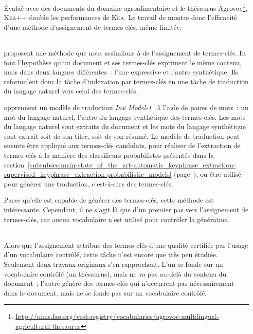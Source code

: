     Évalué avec des documents du domaine agroalimentaire et le thésaurus
    Agrovoc\footnote{\url{http://aims.fao.org/vest-registry/vocabularies/agrovoc-multilingual-agricultural-thesaurus}},
    \textsc{Kea}++ double les performances de \textsc{Kea}. Le travail de
     montre donc l'efficacité d'une méthode
    d'assignement de termes-clés, même limitée.

    ~\\ proposent une méthode que nous assimilons
    à de l'assignement de termes-clés. Ils font l'hypothèse qu'un document et
    ses termes-clés expriment le même contenu, mais dans deux langues
    différentes~: l'une expressive et l'autre synthétique. Ils reformulent donc
    la tâche d'indexation par termes-clés en une tâche de traduction du langage
    naturel vers celui des termes-clés.
    
     apprennent un modèle de traduction
    \textit{\textsc{Ibm} Model-1}~\cite{brown1993ibmmodel1} à l'aide de paires
    de mots~: un mot du langage naturel, l'autre du langage synthétique des
    termes-clés. Les mots du langage naturel sont extraits du document et les
    mots du langage synthétique sont extrait soit de son titre, soit de son
    résumé. Le modèle de traduction peut ensuite être appliqué aux termes-clés
    candidats, pour réaliser de l'extraction de termes-clés à la manière des
    classifieurs probabilistes présentés dans la
    section~\ref{subsubsec:main-state_of_the_art-automatic_keyphrase_extraction-supervised_keyphrase_extraction-probabilistic_models}
    (page~\pageref{subsubsec:main-state_of_the_art-automatic_keyphrase_extraction-supervised_keyphrase_extraction-probabilistic_models}),
    ou être utilisé pour générer une traduction, c'est-à-dire des termes-clés.

    Parce qu'elle est capable de générer des termes-clés, cette méthode est
    intéressante. Cependant, il ne s'agit là que d'un premier pas vers
    l'assignement de termes-clés, car aucun vocabulaire n'est utilisé pour
    contrôler la génération.

    ~\\Alors que l'assignement attribue des termes-clés d'une qualité certifiée
    par l'usage d'un vocabulaire contrôlé, cette tâche n'est encore que très peu
    étudiée. Seulement deux travaux originaux s'en rapprochent. L'un se fonde
    sur un vocabulaire contrôlé (un thésaurus), mais ne va pas au-delà du
    contenu du document~; l'autre génère des termes-clés qui n'occurrent pas
    nécessairement dans le document, mais ne se fonde pas sur un vocabulaire
    contrôlé.

